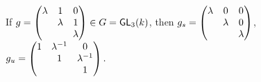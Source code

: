 \begin{example}
If	$g = \left(\begin{matrix}
	\lambda & 1 & 0 \\
	& \lambda & 1 \\
	& & \lambda
	\end{matrix}\right) \in G = \textsf{GL}_3(k)$, then $g_s = \left(\begin{matrix}
	\lambda & 0 & 0 \\
	& \lambda & 0 \\
	& & \lambda
	\end{matrix}\right)$, $g_u = \left(\begin{matrix}
	1 & \lambda^{-1} & 0 \\
	& 1 & \lambda^{-1} \\
	& & 1
	\end{matrix}\right). $
\end{example}

\begin{center}
\end{center}